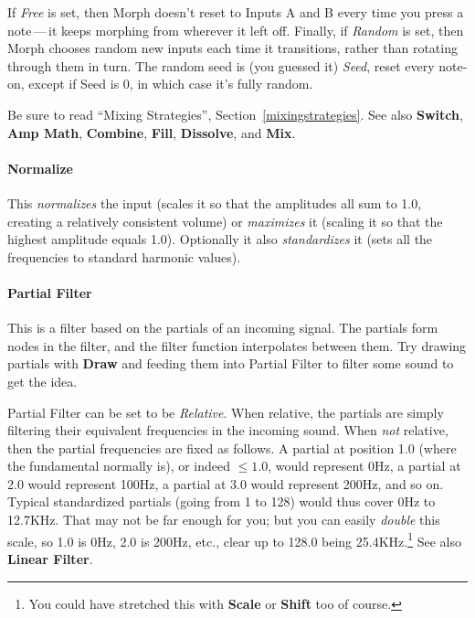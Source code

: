 \documentclass{article}
\begin{document}


If {\it Free} is set, then Morph doesn't reset to Inputs A and B every time you press a note\,---\,it keeps morphing from wherever it left off.  Finally, if {\it Random} is set, then Morph chooses random new inputs each time it transitions, rather than rotating through them in turn. The random seed is (you guessed it) {\it Seed}, reset every note-on, except if Seed is 0, in which case it's fully random.  

Be sure to read ``Mixing Strategies'', Section~\ref{mixingstrategies}.  See also {\bf Switch}, {\bf Amp Math},  {\bf Combine}, {\bf Fill}, {\bf Dissolve}, and {\bf Mix}.

\paragraph{Normalize} This {\it normalizes} the input (scales it so that the amplitudes all sum to 1.0, creating a relatively consistent volume) or {\it maximizes} it (scaling it so that the highest amplitude equals 1.0).  Optionally it also {\it standardizes} it (sets all the frequencies to standard harmonic values).

\paragraph{Partial Filter} This is a filter based on the partials of an incoming signal.  The partials form nodes in the filter, and the filter function interpolates between them.  Try drawing partials with {\bf Draw} and feeding them into Partial Filter to filter some sound to get the idea.  

Partial Filter can be set to be {\it Relative}.  When relative, the partials are simply filtering their equivalent frequencies in the incoming sound.  When {\it not} relative, then the partial frequencies are fixed as follows.  A partial at position 1.0 (where the fundamental normally is), or indeed \(\leq 1.0\), would represent 0Hz, a partial at 2.0 would represent 100Hz, a partial at 3.0 would represent 200Hz, and so on.  Typical standardized partials (going from 1 to 128) would thus cover 0Hz to 12.7KHz.  That may not be far enough for you; but you can easily {\it double} this scale, so 1.0 is 0Hz, 2.0 is 200Hz, etc., clear up to 128.0 being 25.4KHz.\footnote{You could have stretched this with {\bf Scale} or {\bf Shift} too of course.}  See also {\bf Linear Filter}.
\end{document}
